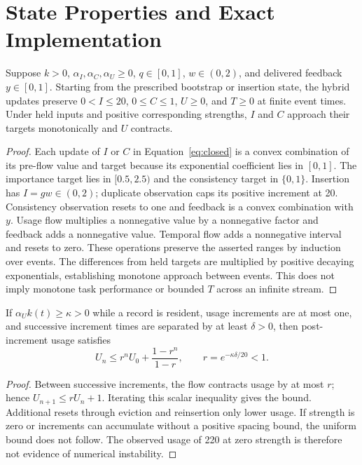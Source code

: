 \section{State Properties and Exact Implementation}\label{app:properties}
\begin{proposition}
Suppose $k>0$, $\alpha_I,\alpha_C,\alpha_U\geq0$, $q\in[0,1]$, $w\in(0,2)$, and delivered feedback $y\in[0,1]$. Starting from the prescribed bootstrap or insertion state, the hybrid updates preserve $0<I\leq20$, $0\leq C\leq1$, $U\geq0$, and $T\geq0$ at finite event times. Under held inputs and positive corresponding strengths, $I$ and $C$ approach their targets monotonically and $U$ contracts.
\end{proposition}
\begin{proof}
Each update of $I$ or $C$ in Equation~\ref{eq:closed} is a convex combination of its pre-flow value and target because its exponential coefficient lies in $[0,1]$. The importance target lies in $[0.5,2.5)$ and the consistency target in $\{0,1\}$. Insertion has $I=gw\in(0,2)$; duplicate observation caps its positive increment at 20. Consistency observation resets to one and feedback is a convex combination with $y$. Usage flow multiplies a nonnegative value by a nonnegative factor and feedback adds a nonnegative value. Temporal flow adds a nonnegative interval and resets to zero. These operations preserve the asserted ranges by induction over events. The differences from held targets are multiplied by positive decaying exponentials, establishing monotone approach between events. This does not imply monotone task performance or bounded $T$ across an infinite stream.
\end{proof}

\begin{proposition}
If $\alpha_U k(t)\geq\kappa>0$ while a record is resident, usage increments are at most one, and successive increment times are separated by at least $\delta>0$, then post-increment usage satisfies
\begin{equation}
U_n\leq r^nU_0+\frac{1-r^n}{1-r},\qquad r=e^{-\kappa\delta/20}<1.
\end{equation}
\end{proposition}
\begin{proof}
Between successive increments, the flow contracts usage by at most $r$; hence $U_{n+1}\leq rU_n+1$. Iterating this scalar inequality gives the bound. Additional resets through eviction and reinsertion only lower usage. If strength is zero or increments can accumulate without a positive spacing bound, the uniform bound does not follow. The observed usage of 220 at zero strength is therefore not evidence of numerical instability.
\end{proof}

